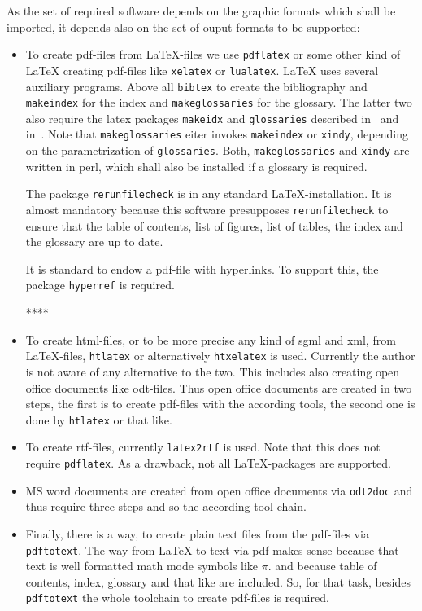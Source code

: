 \documentclass[12pt]{article}
\begin{document}
As the set of required software depends on the graphic formats 
which shall be imported, 
it depends also on the set of ouput-formats 
to be supported: 
%
\begin{itemize}
\item
To create pdf-files from \LaTeX-files we use {\tt pdflatex} 
or some other kind of \LaTeX{} creating pdf-files 
like {\tt xelatex} or {\tt lualatex}. 
\LaTeX{} uses several auxiliary programs. 
Above all {\tt bibtex} to create the bibliography 
and {\tt makeindex} for the index and {\tt makeglossaries} for the glossary. 
The latter two 
also require the latex packages {\tt makeidx} and {\tt glossaries} 
described in~\cite{MkidxShIdxP} and in~\cite{GloP}. 
Note that {\tt makeglossaries} eiter invokes {\tt makeindex} 
or {\tt xindy}, depending on the parametrization of {\tt glossaries}. 
Both, {\tt makeglossaries} and {\tt xindy} are written in perl, 
which shall also be installed if a glossary is required. 

The package {\tt rerunfilecheck} is in any standard \LaTeX-installation. 
It is almost mandatory 
because this software presupposes {\tt rerunfilecheck} 
to ensure that the table of contents, list of figures, list of tables, 
the index and the glossary are up to date. 

It is standard to endow a pdf-file with hyperlinks. 
To support this, the package {\tt hyperref} is required. 

****
\item
To create \gls{html}-files, 
or to be more precise any kind of \gls{sgml} and \gls{xml}, 
from \LaTeX-files, {\tt htlatex} or alternatively {\tt htxelatex} is used. 
Currently the author is not aware of any alternative to the two. 
This includes also creating open office documents like odt-files. 
Thus open office documents are created in two steps, 
the first is to create pdf-files with the according tools, 
the second one is done by {\tt htlatex} or that like. 
\item
To create rtf-files, currently {\tt latex2rtf} is used. 
Note that this does not require {\tt pdflatex}. 
As a drawback, not all \LaTeX-packages are supported. 
\item
MS word documents are created from open office documents via {\tt odt2doc} 
and thus require three steps 
and so the according tool chain. 
\item
Finally, there is a way, to create plain text files from the pdf-files 
via {\tt pdftotext}. 
The way from \LaTeX{} to text via pdf makes sense 
because that text is well formatted math mode symbols like $\pi$. 
and because table of contents, index, glossary and that like are included. 
So, for that task, besides {\tt pdftotext} the whole toolchain to create
pdf-files is required. 
\end{itemize}
\end{document}
